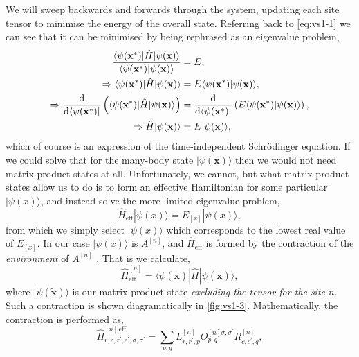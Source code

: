 We will sweep backwards and forwards through the system, updating each site tensor to minimise the energy of the overall state. Referring back to \cref{eq:vs1-1} we can see that it can be minimised by being rephrased as an eigenvalue problem,
\begin{align}
\frac{\langle \psi(\mathbf{x}^{*}) | \hat{H} | \psi(\mathbf{x}) \rangle}{\langle \psi(\mathbf{x}^{*}) | \psi(\mathbf{x}) \rangle } &= E, \notag \\
\Rightarrow \langle \psi(\mathbf{x}^{*}) | \hat{H} | \psi(\mathbf{x}) \rangle &= E \langle \psi(\mathbf{x}^{*}) | \psi(\mathbf{x}) \rangle, \notag \\
\Rightarrow \frac{\mathrm{d}}{\mathrm{d}\langle \psi(\mathbf{x}^{*}) |} \left( \langle \psi(\mathbf{x}^{*}) | \hat{H} | \psi(\mathbf{x}) \rangle \right) &= \frac{\mathrm{d}}{\mathrm{d}\langle \psi(\mathbf{x}^{*}) |} \left(  E \langle \psi(\mathbf{x}^{*}) | \psi(\mathbf{x}) \rangle \right), \notag \\
\Rightarrow \hat{H} |\psi(\mathbf{x}) \rangle &= E | \psi(\mathbf{x}) \rangle,
\label{eq:vs1-6}
\end{align}
which of course is an expression of the time-independent Schr\"{o}dinger equation. If we could solve that for the many-body state \(| \psi (\mathbf{x}) \rangle\) then we would not need matrix product states at all. Unfortunately, we cannot, but what matrix product states allow us to do is to form an effective Hamiltonian for some particular \(| \psi(x) \rangle\), and instead solve the more limited eigenvalue problem,
\begin{equation}
\hat{H}_{\mathrm{eff}} |\psi(x) \rangle = E_{[x]} |\psi(x) \rangle,
\label{eq:vs1-7}
\end{equation}
from which we simply select \(|\psi(x) \rangle\) which corresponds to the lowest real value of \(E_{[x]}\). In our case \(|\psi(x) \rangle\) is \(A^{[n]}\), and \(\hat{H}_{\mathrm{eff}}\) is formed by the contraction of the \emph{environment} of \(A^{[n]}\) \cite{Orus14}. That is we calculate,
\begin{equation}
\hat{H}_{\mathrm{eff}}^{[n]} = \langle \psi(\tilde{\mathbf{x}}) | \hat{H} | \psi(\tilde{\mathbf{x}}) \rangle,
\label{eq:vs1-8}
\end{equation}
where \(|\psi(\tilde{\mathbf{x}}) \rangle \) is our matrix product state \emph{excluding the tensor for the site \(n\)}. Such a contraction is shown diagramatically in \cref{fig:vs1-3}. Mathematically, the contraction is performed as,
\begin{equation}
\hat{H}^{[n]\, \mathrm{eff}}_{r,c,r^{\prime},c^{\prime},\sigma,\sigma^{\prime}} = \sum_{p,q} L^{[n]}_{r,r^{\prime},p} O^{[n] \sigma, \sigma^{\prime}}_{p,q} R^{[n]}_{c,c^{\prime},q},
\label{eq:vs1-9}
\end{equation}
